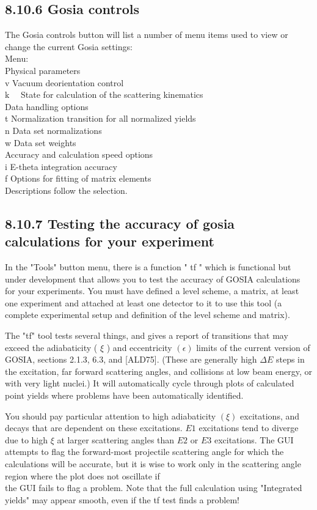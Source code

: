 \documentclass[10pt]{article}
\begin{document}
\subsection*{8.10.6 Gosia controls}
The Gosia controls button will list a number of menu items used to view or change the current Gosia settings:\\
Menu:\\
Physical parameters\\
v Vacuum deorientation control\\
$\mathrm{k} \quad$ State for calculation of the scattering kinematics\\
Data handling options\\
t Normalization transition for all normalized yields\\
n Data set normalizations\\
w Data set weights\\
Accuracy and calculation speed options\\
i E-theta integration accuracy\\
f Options for fitting of matrix elements\\
Descriptions follow the selection.

\subsection*{8.10.7 Testing the accuracy of gosia calculations for your experiment}
In the "Tools" button menu, there is a function " tf " which is functional but under development that allows you to test the accuracy of GOSIA calculations for your experiments. You must have defined a level scheme, a matrix, at least one experiment and attached at least one detector to it to use this tool (a complete experimental setup and definition of the level scheme and matrix).

The "tf" tool tests several things, and gives a report of transitions that may exceed the adiabaticity ( $\xi$ ) and eccentricity $(\epsilon)$ limits of the current version of GOSIA, sections 2.1.3, 6.3, and [ALD75]. (These are generally high $\Delta E$ steps in the excitation, far forward scattering angles, and collisions at low beam energy, or with very light nuclei.) It will automatically cycle through plots of calculated point yields where problems have been automatically identified.

You should pay particular attention to high adiabaticity $(\xi)$ excitations, and decays that are dependent on these excitations. $E 1$ excitations tend to diverge due to high $\xi$ at larger scattering angles than $E 2$ or $E 3$ excitations. The GUI attempts to flag the forward-most projectile scattering angle for which the calculations will be accurate, but it is wise to work only in the scattering angle region where the plot does not oscillate if\\
the GUI fails to flag a problem. Note that the full calculation using "Integrated yields" may appear smooth, even if the tf test finds a problem!
\end{document}
